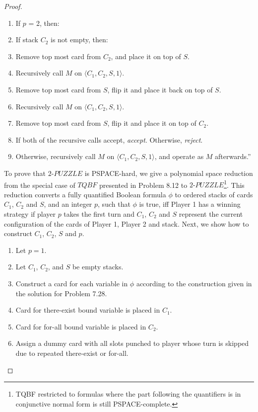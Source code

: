 \documentclass[11pt]{article}
\begin{document}
\begin{proof}
\begin{enumerate}
\item If $p$ = 2, then:
\item \hspace*{0.5cm} If stack $C_2$ is not empty, then:
\item \hspace*{1.0cm} Remove top most card from $C_2$, and place it on top of $S$.
\item \hspace*{1.0cm} Recursively call $M$ on $\langle C_1, C_2, S, 1 \rangle$.
\item \hspace*{1.0cm} Remove top most card from $S$, flip it and place it back on top of $S$.
\item \hspace*{1.0cm} Recursively call $M$ on $\langle C_1, C_2, S, 1 \rangle$.
\item \hspace*{1.0cm} Remove top most card from $S$, flip it and place it on top of $C_2$.
\item \hspace*{1.0cm} If both of the recursive calls accept, \textit{accept}. Otherwise, \textit{reject}.
\item \hspace*{0.5cm} Otherwise, recursively call $M$ on $\langle C_1, C_2, S, 1 \rangle$, and operate as $M$ afterwards.\textquotedblright
\end{enumerate}

To prove that $2\text{-}PUZZLE$ is PSPACE-hard, we give a polynomial space reduction from the special case of $TQBF$ presented in Problem 8.12 to $2\text{-}PUZZLE$\footnote{TQBF restricted to formulas where the part following the quantifiers is in conjunctive normal form is still PSPACE-complete.}. This reduction converts a fully quantified Boolean formula $\phi$ to ordered stacks of cards $C_1$, $C_2$ and $S$, and an integer $p$, such that $\phi$ is true, iff Player 1 has a winning strategy if player $p$ takes the first turn and $C_1$, $C_2$ and $S$ represent the current configuration of the cards of Player 1, Player 2 and stack. Next, we show how to construct $C_1$, $C_2$, $S$ and $p$.
\begin{enumerate}
\item Let $p = 1$.
\item Let $C_1$, $C_2$, and $S$ be empty stacks.
\item Construct a card for each variable in $\phi$ according to the construction given in the solution for Problem 7.28.
\item Card for there-exist bound variable is placed in $C_1$.
\item Card for for-all bound variable is placed in $C_2$.
\item Assign a dummy card with all slots punched to player whose turn is skipped due to repeated there-exist or for-all.
\end{enumerate}
\end{proof}
\end{document}
